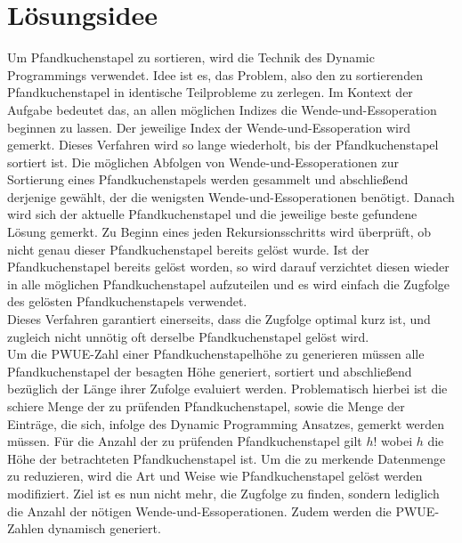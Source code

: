 \maketitle
\tableofcontents

\vspace{0.5cm}


\section{Lösungsidee}\label{sec:losungsidee}
Um Pfandkuchenstapel zu sortieren, wird die Technik des Dynamic Programmings verwendet.
Idee ist es, das Problem, also den zu sortierenden Pfandkuchenstapel in identische Teilprobleme zu zerlegen.
Im Kontext der Aufgabe bedeutet das, an allen möglichen Indizes die Wende-und-Essoperation beginnen zu lassen.
Der jeweilige Index der Wende-und-Essoperation wird gemerkt.
Dieses Verfahren wird so lange wiederholt, bis der Pfandkuchenstapel sortiert ist.
Die möglichen Abfolgen von Wende-und-Essoperationen zur Sortierung eines Pfandkuchenstapels werden gesammelt
und abschlie{\ss}end derjenige gewählt, der die wenigsten Wende-und-Essoperationen benötigt.
Danach wird sich der aktuelle Pfandkuchenstapel und die jeweilige beste gefundene Lösung gemerkt.
Zu Beginn eines jeden Rekursionsschritts wird überprüft, ob nicht genau dieser Pfandkuchenstapel bereits gelöst wurde.
Ist der Pfandkuchenstapel bereits gelöst worden, so wird darauf verzichtet diesen wieder in alle möglichen Pfandkuchenstapel
aufzuteilen und es wird einfach die Zugfolge des gelösten Pfandkuchenstapels verwendet. \\
Dieses Verfahren garantiert einerseits, dass die Zugfolge optimal kurz ist, und zugleich nicht unnötig
oft derselbe Pfandkuchenstapel gelöst wird. \\
Um die PWUE-Zahl einer Pfandkuchenstapelhöhe zu generieren müssen alle Pfandkuchenstapel der besagten Höhe generiert,
sortiert und abschlie{\ss}end bezüglich der Länge ihrer Zufolge evaluiert werden.
Problematisch hierbei ist die schiere Menge der zu prüfenden Pfandkuchenstapel, sowie die Menge der Einträge, die sich,
infolge des Dynamic Programming Ansatzes, gemerkt werden müssen.
Für die Anzahl der zu prüfenden Pfandkuchenstapel gilt $h!$ wobei $h$ die Höhe der betrachteten Pfandkuchenstapel ist.
Um die zu merkende Datenmenge zu reduzieren, wird die Art und Weise wie Pfandkuchenstapel gelöst werden modifiziert.
Ziel ist es nun nicht mehr, die Zugfolge zu finden, sondern lediglich die Anzahl der nötigen Wende-und-Essoperationen.
Zudem werden die PWUE-Zahlen dynamisch generiert.
